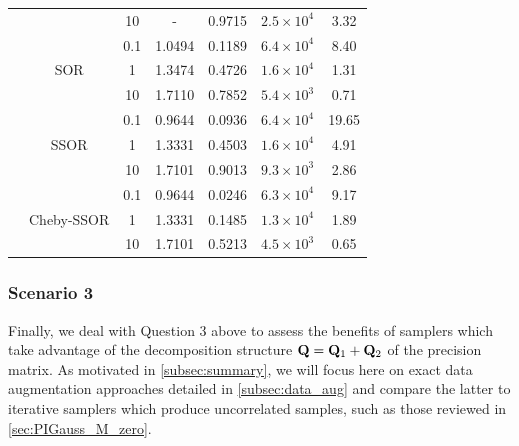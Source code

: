 \documentclass[nohypdvips,onefignum,onetabnum]{siamart171218}
\begin{document}
\begin{table}
\begin{center}
\begin{tabular}{|cl|c|c|c|c|c|}
      &\multicolumn{1}{|c|}{}& 10 & -  & 0.9715 & $2.5 \times 10^4$ & 3.32\\
      \cline{2-7}
      &\multicolumn{1}{|c|}{} & 0.1 & 1.0494  & 0.1189 & $6.4 \times 10^4$ & 8.40\\
      &\multicolumn{1}{|c|}{SOR}& 1 & 1.3474  & 0.4726 & $1.6 \times 10^4$ & 1.31\\
      &\multicolumn{1}{|c|}{}& 10 & 1.7110  & 0.7852 & $5.4 \times 10^3$ & 0.71\\
      \cline{2-7}
      &\multicolumn{1}{|c|}{} & 0.1 & 0.9644  & 0.0936 & $6.4 \times 10^4$ & 19.65\\
      &\multicolumn{1}{|c|}{SSOR}& 1 & 1.3331  & 0.4503 & $1.6 \times 10^4$ & 4.91\\
      &\multicolumn{1}{|c|}{}& 10 & 1.7101  & 0.9013 & $9.3 \times 10^3$ & 2.86\\
      \cline{2-7}
      &\multicolumn{1}{|c|}{} & 0.1 & 0.9644  & 0.0246 & $6.3 \times 10^4$ & 9.17\\
      &\multicolumn{1}{|c|}{Cheby-SSOR}& 1 & 1.3331  & 0.1485 & $1.3 \times 10^4$ & 1.89\\
      &\multicolumn{1}{|c|}{}& 10 & 1.7101  & 0.5213 & $4.5 \times 10^3$ & 0.65\\
      \hline
    \end{tabular}    
  \end{center}
\end{table}


\subsubsection{Scenario 3}\label{subsubsec:scenario3}
Finally, we deal with Question 3 above to assess the benefits of samplers which take advantage of the decomposition structure $\mathbf{Q} = \mathbf{Q}_1 + \mathbf{Q}_2$ of the precision matrix.
As motivated in \cref{subsec:summary}, we will focus here on exact data augmentation approaches detailed in \cref{subsec:data_aug} and compare the latter to iterative samplers which produce uncorrelated samples, such as those reviewed in \cref{sec:PIGauss_M_zero}.
\end{document}
